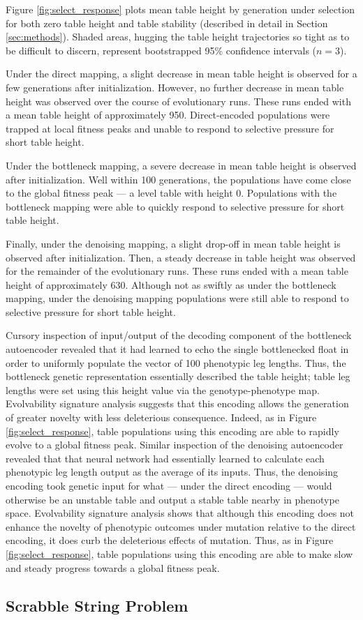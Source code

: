 

Figure \ref{fig:select_response} plots mean table height by generation under selection for both zero table height and table stability (described in detail in Section \ref{sec:methods}).
Shaded areas, hugging the table height trajectories so tight as to be difficult to discern, represent bootstrapped 95\% confidence intervals ($n=3$).

Under the direct mapping, a slight decrease in mean table height is observed for a few generations after initialization.
However, no further decrease in mean table height was observed over the course of evolutionary runs.
These runs ended with a mean table height of approximately 950.
Direct-encoded populations were trapped at local fitness peaks and unable to respond to selective pressure for short table height.

Under the bottleneck mapping, a severe decrease in mean table height is observed after initialization.
Well within 100 generations, the populations have come close to the global fitness peak --- a level table with height 0.
Populations with the bottleneck mapping were able to quickly respond to selective pressure for short table height.

Finally, under the denoising mapping, a slight drop-off in mean table height is observed after initialization.
Then, a steady decrease in table height was observed for the remainder of the evolutionary runs.
These runs ended with a mean table height of approximately 630.
Although not as swiftly as under the bottleneck mapping, under the denoising mapping populations were still able to respond to selective pressure for short table height.

Cursory inspection of input/output of the decoding component of the bottleneck autoencoder revealed that it had learned to echo the single bottlenecked float in order to uniformly populate the vector of 100 phenotypic leg lengths.
Thus, the bottleneck genetic representation essentially described the table height; table leg lengths were set using this height value via the genotype-phenotype map.
Evolvability signature analysis suggests that this encoding allows the generation of greater novelty with less deleterious consequence.
Indeed, as in Figure \ref{fig:select_response}, table populations using this encoding are able to rapidly evolve to a global fitness peak.
Similar inspection of the denoising autoencoder revealed that that neural network had essentially learned to calculate each phenotypic leg length output as the average of its inputs.
Thus, the denoising encoding took genetic input for what --- under the direct encoding --- would otherwise be an unstable table and output a stable table nearby in phenotype space.
Evolvability signature analysis shows that although this encoding does not enhance the novelty of phenotypic outcomes under mutation relative to the direct encoding, it does curb the deleterious effects of mutation.
Thus, as in Figure \ref{fig:select_response}, table populations using this encoding are able to make slow and steady progress towards a global fitness peak.

\subsection{Scrabble String Problem}
